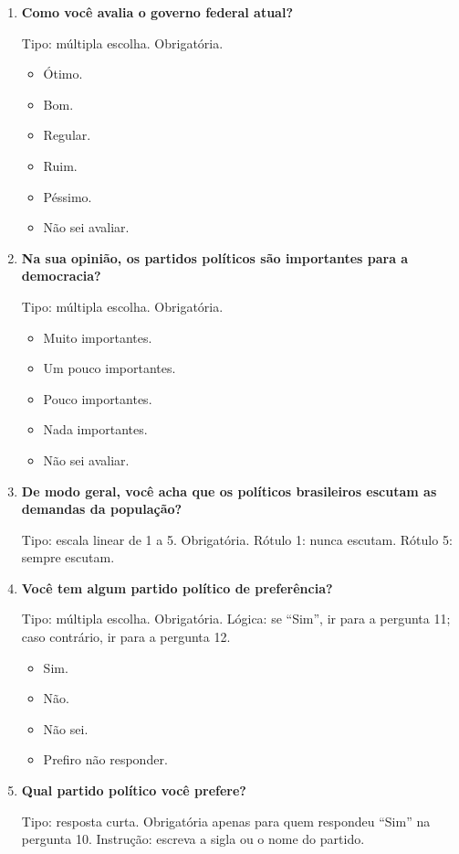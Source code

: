 \documentclass[11pt,a4paper]{article}
\begin{document}
\begin{enumerate}[resume]
\item \textbf{Como você avalia o governo federal atual?}

Tipo: múltipla escolha. Obrigatória.
\begin{itemize}
\item Ótimo.
\item Bom.
\item Regular.
\item Ruim.
\item Péssimo.
\item Não sei avaliar.
\end{itemize}

\item \textbf{Na sua opinião, os partidos políticos são importantes para a democracia?}

Tipo: múltipla escolha. Obrigatória.
\begin{itemize}
\item Muito importantes.
\item Um pouco importantes.
\item Pouco importantes.
\item Nada importantes.
\item Não sei avaliar.
\end{itemize}

\item \textbf{De modo geral, você acha que os políticos brasileiros escutam as demandas da população?}

Tipo: escala linear de 1 a 5. Obrigatória. Rótulo 1: nunca escutam. Rótulo 5: sempre escutam.

\item \textbf{Você tem algum partido político de preferência?}

Tipo: múltipla escolha. Obrigatória. Lógica: se ``Sim'', ir para a pergunta 11; caso contrário, ir para a pergunta 12.
\begin{itemize}
\item Sim.
\item Não.
\item Não sei.
\item Prefiro não responder.
\end{itemize}

\item \textbf{Qual partido político você prefere?}

Tipo: resposta curta. Obrigatória apenas para quem respondeu ``Sim'' na pergunta 10. Instrução: escreva a sigla ou o nome do partido.
\end{enumerate}
\end{document}
